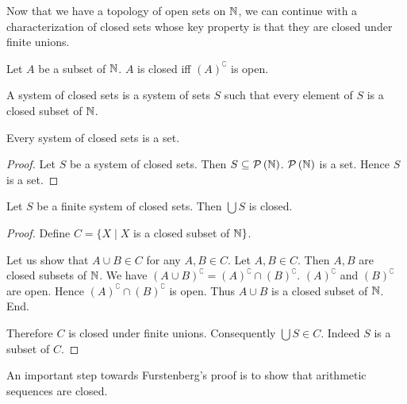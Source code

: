 \documentclass{article}
\let\oldcomplement\complement
\renewcommand{\complement}[1]{\left(#1\right)^{\oldcomplement}}
\begin{document}
  Now that we have a topology of open sets on $\mathbb{N}$, we can continue
  with a characterization of closed sets whose key property is that they are
  closed under finite unions.

  \begin{forthel}
    \begin{definition}
      Let $A$ be a subset of $\mathbb{N}$.
      $A$ is closed iff $\complement{A}$ is open.
    \end{definition}

    \begin{definition}
      A system of closed sets is a system of sets $S$ such that every element of
      $S$ is a closed subset of $\mathbb{N}$.
    \end{definition}

    \begin{lemma}
      Every system of closed sets is a set.
    \end{lemma}
    \begin{proof}
      Let $S$ be a system of closed sets.
      Then $S \subseteq \mathcal{P}\left(\mathbb{N}\right)$.
      $\mathcal{P}\left(\mathbb{N}\right)$ is a set.
      Hence $S$ is a set.
    \end{proof}

    \begin{lemma}
      Let $S$ be a finite system of closed sets.
      Then $\bigcup S$ is closed.
    \end{lemma}
    \begin{proof}
      Define $C = \{ X \mid X$ is a closed subset of $\mathbb{N} \}$.

      Let us show that $A \cup B \in C$ for any $A, B \in C$.
        Let $A, B \in C$.
        Then $A, B$ are closed subsets of $\mathbb{N}$.
        We have $\complement{A \cup B} = \complement{A} \cap \complement{B}$.
        $\complement{A}$ and $\complement{B}$ are open.
        Hence $\complement{A} \cap \complement{B}$ is open.
        Thus $A \cup B$ is a closed subset of $\mathbb{N}$.
      End.

      Therefore $C$ is closed under finite unions.
      Consequently $\bigcup S \in C$.
      Indeed $S$ is a subset of $C$.
    \end{proof}
  \end{forthel}

  An important step towards Furstenberg's proof is to show that arithmetic
  sequences are closed.
\end{document}
